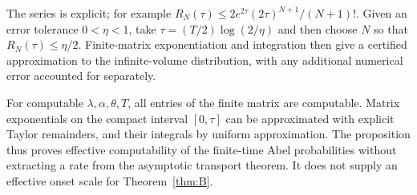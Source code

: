 The series is explicit; for example
$R_N(\tau)\le2e^{2\tau}(2\tau)^{N+1}/(N+1)!$.
Given an error tolerance $0<\eta<1$, take
$\tau=(T/2)\log(2/\eta)$ and then choose $N$ so that $R_N(\tau)\le\eta/2$.
Finite-matrix exponentiation and integration then give a certified approximation to the infinite-volume distribution, with any additional numerical error accounted for separately.

For computable $\lambda,\alpha,\theta,T$, all entries of the finite matrix are computable. Matrix exponentials on the compact interval $[0,\tau]$ can be approximated with explicit Taylor remainders, and their integrals by uniform approximation. The proposition thus proves effective computability of the finite-time Abel probabilities without extracting a rate from the asymptotic transport theorem. It does not supply an effective onset scale for Theorem~\ref{thm:B}.

